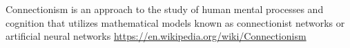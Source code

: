 \documentclass[a4paper]{article}
\title{}
\date{}
\begin{document}
    \maketitle
    
    
    Connectionism is an approach to the study of human mental processes and cognition that utilizes mathematical models known as connectionist networks or artificial neural networks \url{https://en.wikipedia.org/wiki/Connectionism}
\end{document}
